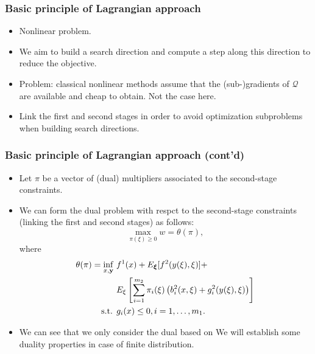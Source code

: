 \documentclass[french]{beamer}
\def\bxi{\boldsymbol\xi}
\begin{document}
\begin{frame}
\frametitle{Basic principle of Lagrangian approach}

\begin{itemize}
\item
Nonlinear problem.
\item
We aim to build a search direction and compute a step along this direction to reduce the objective.
\item
Problem: classical nonlinear methods assume that the (sub-)gradients of $\mathcal{Q}$ are available and cheap to obtain.
Not the case here.
\item
Link the first and second stages in order to avoid optimization subproblems when building search directions.
\end{itemize}

\end{frame}

\begin{frame}
\frametitle{Basic principle of Lagrangian approach (cont'd)}

\begin{itemize}
	\item 
Let $\pi$ be a vector of (dual) multipliers associated to the second-stage constraints.
\item
We can form the dual problem with respct to the second-stage constraints (linking the first and second stages) as follows:
\[
\max_{\pi(\xi) \geq 0} w = \theta(\pi),
\]
where
\begin{align*}
\theta(\pi) = \inf_{x, {\bf y}}\ & f^1(x)+E_{\bxi} [f^2(y(\xi),\xi)] + \\
& E_{\xi}\left[\sum_{i=1}^{m_2} \pi_i(\xi) \left( b_i^2(x,\xi) +
  g_i^2(y(\xi), \xi) \right) \right] \\
\text{s.t. } & g_i(x) \leq 0, i=1,\ldots{},m_1.
\end{align*}
\item
We can see that we only consider the dual based on 
We will establish some duality properties in case of finite distribution.
\end{itemize}

\end{frame}
\end{document}
